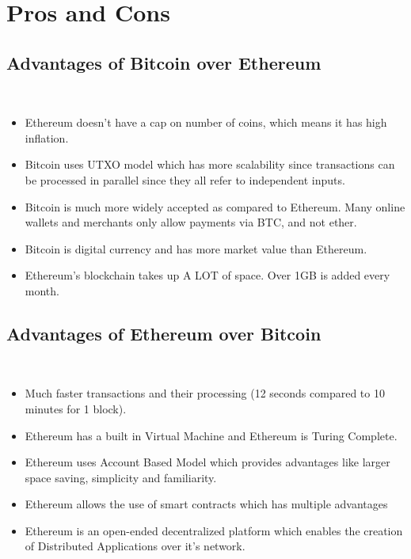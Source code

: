 \section{Pros and Cons}
\subsection{Advantages of Bitcoin over Ethereum}\\
\begin{itemize}
	\item Ethereum doesn't have a cap on number of coins, which means it has high inflation.
	\item Bitcoin uses UTXO model which has more scalability since transactions can be processed in parallel since they all refer to independent inputs.
	\item Bitcoin is much more widely accepted as compared to Ethereum. Many online wallets and merchants only allow payments via BTC, and not ether.
	\item Bitcoin is digital currency and has more market value than Ethereum.
	\item Ethereum's blockchain takes up A LOT of space. Over 1GB is added every month.
\end{itemize}
\subsection{Advantages of Ethereum over Bitcoin}\\
\begin{itemize}
	\item Much faster transactions and their processing (12 seconds compared to 10 minutes for 1 block).
	\item Ethereum has a built in Virtual Machine and Ethereum is Turing Complete.
	\item Ethereum uses Account Based Model which provides advantages like larger space saving, simplicity and familiarity.
	\item Ethereum allows the use of smart contracts which has multiple advantages
	\item Ethereum is an open-ended decentralized platform which enables the creation of Distributed Applications over it's network.

\end{itemize}
